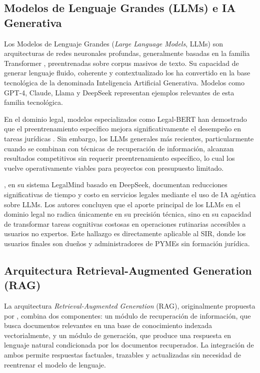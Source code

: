 \documentclass[12pt,a4paper,oneside]{report}
\begin{document}
\subsection{Modelos de Lenguaje Grandes (LLMs) e IA Generativa}\label{subsec:llm-ia-generativa}

Los Modelos de Lenguaje Grandes (\textit{Large Language Models}, LLMs) son arquitecturas de redes neuronales profundas, generalmente basadas en la familia Transformer \parencite{vaswani2017}, preentrenadas sobre corpus masivos de texto. Su capacidad de generar lenguaje fluido, coherente y contextualizado los ha convertido en la base tecnológica de la denominada Inteligencia Artificial Generativa. Modelos como GPT-4, Claude, Llama y DeepSeek representan ejemplos relevantes de esta familia tecnológica.

En el dominio legal, modelos especializados como Legal-BERT han demostrado que el preentrenamiento específico mejora significativamente el desempeño en tareas jurídicas \parencite{chalkidis2020}. Sin embargo, los LLMs generales más recientes, particularmente cuando se combinan con técnicas de recuperación de información, alcanzan resultados competitivos sin requerir preentrenamiento específico, lo cual los vuelve operativamente viables para proyectos con presupuesto limitado.

\textcite{raju2025}, en su sistema LegalMind basado en DeepSeek, documentan reducciones significativas de tiempo y costo en servicios legales mediante el uso de IA agéntica sobre LLMs. Los autores concluyen que el aporte principal de los LLMs en el dominio legal no radica únicamente en su precisión técnica, sino en su capacidad de transformar tareas cognitivas costosas en operaciones rutinarias accesibles a usuarios no expertos. Este hallazgo es directamente aplicable al SIR, donde los usuarios finales son dueños y administradores de PYMEs sin formación jurídica.

\subsection{Arquitectura Retrieval-Augmented Generation (RAG)}\label{subsec:arquitectura-rag}

La arquitectura \textit{Retrieval-Augmented Generation} (RAG), originalmente propuesta por \textcite{lewis2020}, combina dos componentes: un módulo de recuperación de información, que busca documentos relevantes en una base de conocimiento indexada vectorialmente, y un módulo de generación, que produce una respuesta en lenguaje natural condicionada por los documentos recuperados. La integración de ambos permite respuestas factuales, trazables y actualizadas sin necesidad de reentrenar el modelo de lenguaje.
\end{document}
